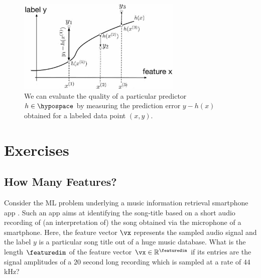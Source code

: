 \documentclass[12pt]{report}
\begin{document}
\begin{figure}[htbp]
    \centering
   \includegraphics[width=0.7\textwidth]{EmpError.jpg}  
    \caption{We can evaluate the quality of a particular predictor $h \in \hypospace$ by measuring the 
    prediction error $y- h(x)$ obtained for a labeled data point $(x,y)$. }
  \label{fig_emp_error}
\end{figure}

\newpage
\section{Exercises} 

\subsection{ How Many Features?} 
\label{ex_compML_shazaam}
Consider the ML problem underlying a music information retrieval smartphone 
app \cite{ShazamPaper}. Such an app aims at identifying the song-title based 
on a short audio recording of (an interpretation of) the song obtained via the 
microphone of a smartphone. Here, the feature vector $\vx$ represents the 
sampled audio signal and the label $y$ is a particular song title out of a huge 
music database. What is the length $\featuredim$ of the feature vector 
$\vx \in \mathbb{R}^{\featuredim}$ if its entries are the signal amplitudes of 
a $20$ second long recording which is sampled at a rate of $44$ kHz?
\end{document}
